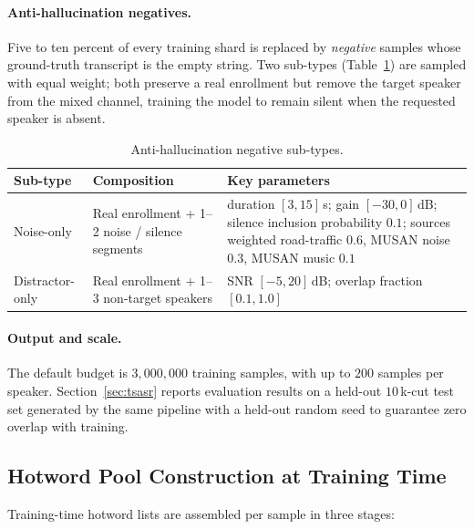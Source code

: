 \paragraph{Anti-hallucination negatives.}
Five to ten percent of every training shard is replaced by
\emph{negative} samples whose ground-truth transcript is the empty
string. Two sub-types (Table~\ref{tab:tsasr_negatives}) are sampled
with equal weight; both preserve a real enrollment but remove the
target speaker from the mixed channel, training the model to remain
silent when the requested speaker is absent.

\begin{table}[t]
  \caption{Anti-hallucination negative sub-types.}
  \label{tab:tsasr_negatives}
  \centering
  \small
  \setlength{\tabcolsep}{4pt}
  \begin{tabular}{lp{4.5cm}p{6.5cm}}
    \toprule
    Sub-type & Composition & Key parameters \\
    \midrule
    Noise-only       & Real enrollment + 1--2 noise / silence segments & duration $[3,15]$\,s; gain $[-30, 0]$\,dB; silence inclusion probability $0.1$; sources weighted road-traffic $0.6$, MUSAN noise $0.3$, MUSAN music $0.1$ \\
    Distractor-only  & Real enrollment + 1--3 non-target speakers      & SNR $[-5, 20]$\,dB; overlap fraction $[0.1, 1.0]$ \\
    \bottomrule
  \end{tabular}
\end{table}

\paragraph{Output and scale.}
The default budget is $3{,}000{,}000$ training samples, with up to
$200$ samples per speaker. Section~\ref{sec:tsasr} reports
evaluation results on a held-out $10\,$k-cut test set generated by
the same pipeline with a held-out random seed to guarantee zero
overlap with training.

\subsection{Hotword Pool Construction at Training Time}
\label{subsec:hotword-pool}

Training-time hotword lists are assembled per sample in three stages:

